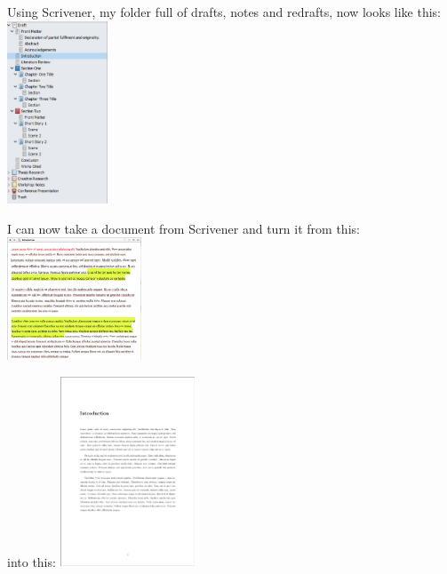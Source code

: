 \documentclass[unknownkeysallowed,usepdftitle=false, aspectratio=169,parskip=full]{beamer}
\newcommand{\secvariable}{nothing}
\begin{document}
\begin{frame}\label{\secvariable}
  \begin{multicols*}{3}
  Using Scrivener, my folder full of drafts, notes and redrafts, now looks like this: 
\includegraphics[width=3cm,keepaspectratio]{Images/ScrivFolderStructure.JPG}
\columnbreak %

      I can now take a document from Scrivener and turn it from this:
   \includegraphics[width=4cm,keepaspectratio]{Images/ScrivMessyText.JPG}
    
      
\columnbreak %
into this:
 \includegraphics[width=4cm,keepaspectratio]{Images/TexLiveText.JPG}

  \end{multicols*}

  
\end{frame}
\end{document}
